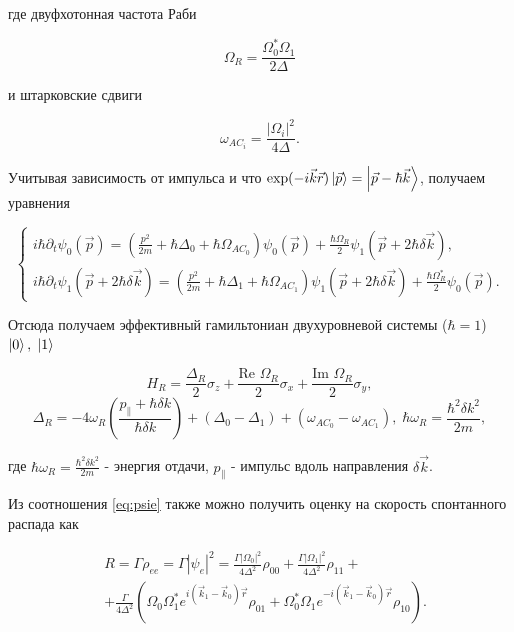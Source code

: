 где двуфхотонная частота Раби

\begin{equation}
	\Omega_{R} = \frac{\Omega_0^* \Omega_1}{2\Delta}
\end{equation}

и штарковские сдвиги

\begin{equation}
	\omega_{AC_i} = \frac{|\Omega_{i}|^2}{4\Delta}.
\end{equation}

Учитывая зависимость от импульса и что $\exp(-i\vec{k}\vec{r})\left| \vec{p} \right\rangle = \left| \vec{p}-\hbar \vec{k} \right\rangle$, получаем уравнения

\begin{equation}
	\begin{cases}
		i\hbar \partial_t \psi_{0}(\vec{p}) = \left(\frac{p^2}{2m} + \hbar \Delta_{0} + \hbar \Omega_{AC_0}\right) \psi_{0}(\vec{p}) + \frac{\hbar \Omega_{R}}{2}\psi_{1}(\vec{p} + 2\hbar \delta\vec{k}), \\
		i\hbar \partial_t \psi_{1}(\vec{p}+2\hbar \delta\vec{k}) = \left(\frac{p^2}{2m} + \hbar \Delta_{1} + \hbar \Omega_{AC_1}\right) \psi_{1}(\vec{p}+2\hbar \delta\vec{k}) + \frac{\hbar \Omega_{R}^*}{2}\psi_{0}(\vec{p}).
	\end{cases}
\end{equation}

Отсюда получаем эффективный гамильтониан двухуровневой системы ($\hbar=1$) $\left| 0 \right\rangle, \; \left| 1 \right\rangle$

\begin{equation}
	H_R = \frac{\Delta_R}{2}\sigma_{z} + \frac{\text{Re }\Omega_{R}}{2}\sigma_{x} + \frac{\text{Im }\Omega_{R}}{2}\sigma_{y},
\end{equation}
\begin{equation}
	\Delta_{R} = -4\omega_{R}\left(\frac{p_{\parallel}+\hbar \delta k}{\hbar \delta k}\right) + (\Delta_0 - \Delta_1) + (\omega_{AC_0} - \omega_{AC_1}), \; \hbar\omega_{R} = \frac{\hbar^2 \delta k ^2}{2m},
\end{equation}

где $\hbar\omega_R = \frac{\hbar^2 \delta k^2}{2m}$ - энергия отдачи, $p_{\parallel}$ - импульс вдоль направления $\delta \vec{k}$. 


Из соотношения \ref{eq:psie} также можно получить оценку на скорость спонтанного распада как

\begin{equation}
	\begin{aligned}
		& R=\Gamma\rho_{ee}=\Gamma\left|\psi_e\right|^2=\frac{\Gamma|\Omega_0|^2}{4\Delta^2}\rho_{00}+\frac{\Gamma|\Omega_1|^2}{4\Delta^2}\rho_{11}+\\
& +\frac{\Gamma}{4\Delta^2}\left(\Omega_0\Omega_1^*e^{i\left(\vec{k}_1-\vec{k}_0\right)\vec{r}}\rho_{01}+\Omega_0^*\Omega_1e^{-i\left(\vec{k}_1-\vec{k}_0\right)\vec{r}}\rho_{10}\right).
	\end{aligned}
\end{equation}

